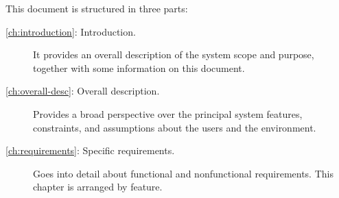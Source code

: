 This document is structured in three parts:
\begin{description}
\item[\autoref{ch:introduction}: Introduction.] It provides an overall description of the system scope and purpose, together with some information on this document.
\item[\autoref{ch:overall-desc}: Overall description.] Provides a broad perspective over the principal system features, constraints, and assumptions about the users and the environment.
\item[\autoref{ch:requirements}: Specific requirements.] Goes into detail about functional and nonfunctional requirements. This chapter is arranged by feature.
\end{description}
